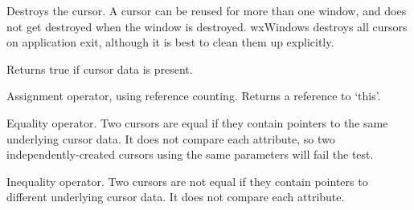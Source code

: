 

Destroys the cursor. A cursor can be reused for more
than one window, and does not get destroyed when the window is
destroyed. wxWindows destroys all cursors on application exit, although
it is best to clean them up explicitly.

\label{wxcursorok}


Returns true if cursor data is present.

\label{wxcursorassignment}


Assignment operator, using reference counting. Returns a reference
to `this'.

\label{wxcursorequals}


Equality operator. Two cursors are equal if they contain pointers
to the same underlying cursor data. It does not compare each attribute,
so two independently-created cursors using the same parameters will
fail the test.

\label{wxcursornotequals}


Inequality operator. Two cursors are not equal if they contain pointers
to different underlying cursor data. It does not compare each attribute.



